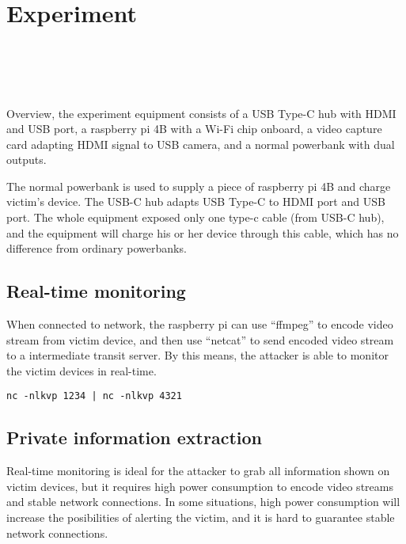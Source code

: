 \section{Experiment}
\label{sec:experiment}
\noindent{}\\
\\
\\
\\
Overview, the experiment equipment consists of
a USB Type-C hub with HDMI and USB port,
a raspberry pi 4B with a Wi-Fi chip onboard,
a video capture card adapting HDMI signal to USB camera,
and a normal powerbank with dual outputs.

The normal powerbank is used to supply a piece of raspberry pi 4B and
charge victim's device.
The USB-C hub adapts USB Type-C to HDMI port and USB port.
 The whole equipment exposed only one type-c cable (from USB-C hub),
and the equipment will charge his or her device through this cable,
which has no difference from ordinary powerbanks.


\subsection{Real-time monitoring}

When connected to network,
the raspberry pi can use ``ffmpeg'' to encode video stream from victim device,
and then use ``netcat'' to send encoded video stream to a intermediate transit server.
By this means, the attacker is able to monitor the victim devices in real-time.

\begin{lstlisting}[caption={Precondition Checking for the Selfdestruct Call},label=lst1:mxm]
    nc -nlkvp 1234 | nc -nlkvp 4321

\end{lstlisting}


\subsection{Private information extraction}

Real-time monitoring is ideal for the attacker to grab all information shown on victim devices,
 but it requires high power consumption to encode video streams and stable network connections.
In some situations, high power consumption will increase the posibilities of alerting the victim,
and it is hard to guarantee stable network connections.

